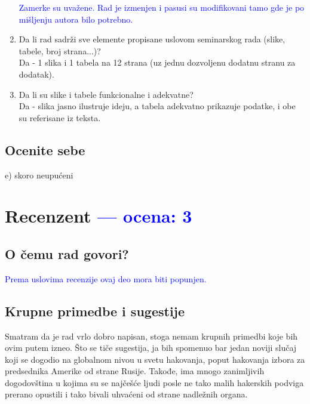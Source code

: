 \documentclass[a4paper]{report}
\newcommand{\odgovor}[1]{\textcolor{blue}{#1}}
\begin{document}
\begin{enumerate}
\odgovor{Zamerke su uvažene. Rad je izmenjen i pasusi su modifikovani tamo gde je po mišljenju autora bilo potrebno.}
\item Da li rad sadrži sve elemente propisane uslovom seminarskog rada (slike, tabele, broj strana...)?\\
Da - 1 slika i 1 tabela na 12 strana (uz jednu dozvoljenu dodatnu stranu za dodatak).
\item Da li su slike i tabele funkcionalne i adekvatne?\\
Da - slika jasno ilustruje ideju, a tabela adekvatno prikazuje podatke, i obe su referisane iz teksta.
\end{enumerate}

\section{Ocenite sebe}
e) skoro neupućeni


\chapter{Recenzent \odgovor{--- ocena: 3} }


\section{O čemu rad govori?}

\odgovor{Prema uslovima recenzije ovaj deo mora biti popunjen.}



\section{Krupne primedbe i sugestije}
Smatram da je rad vrlo dobro napisan, stoga nemam krupnih primedbi koje bih ovim putem izneo.
Što se tiče sugestija, ja bih spomenuo bar jedan noviji slučaj koji se dogodio na globalnom nivou u svetu hakovanja, poput hakovanja izbora za predsednika Amerike od strane Rusije.
Takođe, ima mnogo zanimljivih dogodovština u kojima su se najčešće ljudi posle ne tako malih hakerskih podviga prerano opustili i tako bivali uhvaćeni od strane nadležnih organa.
\end{document}
